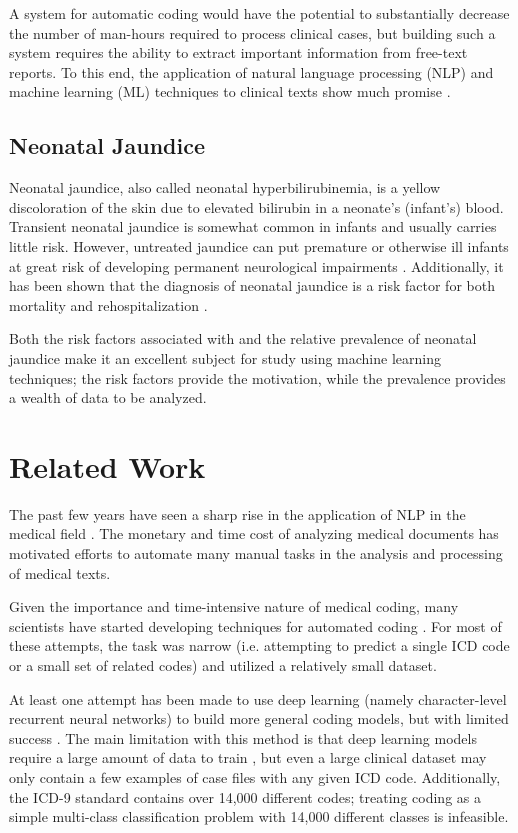 \documentclass[conference]{IEEEtran}
\begin{document}
A system for automatic coding would have the potential to substantially decrease the number of man-hours required to process clinical cases, but building such a system requires the ability to extract important information from free-text reports. To this end, the application of natural language processing (NLP) and machine learning (ML) techniques to clinical texts show much promise \cite{Meystre}.

\subsection{Neonatal Jaundice}\label{AA}
Neonatal jaundice, also called neonatal hyperbilirubinemia, is a yellow discoloration of the skin due to elevated bilirubin in a neonate's (infant's) blood. Transient neonatal jaundice is somewhat common in infants and usually carries little risk. However, untreated jaundice can put premature or otherwise ill infants at great risk of developing permanent neurological impairments \cite{Lantzy}. Additionally, it has been shown that the diagnosis of neonatal jaundice is a risk factor for both mortality and rehospitalization \cite{Escobar}. 

Both the risk factors associated with and the relative prevalence of neonatal jaundice make it an excellent subject for study using machine learning techniques; the risk factors provide the motivation, while the prevalence provides a wealth of data to be analyzed.

\section{Related Work}
The past few years have seen a sharp rise in the application of NLP in the medical field \cite{Wolniewicz}. The monetary and time cost of analyzing medical documents has motivated efforts to automate many manual tasks in the analysis and processing of medical texts.

Given the importance and time-intensive nature of medical coding, many scientists have started developing techniques for automated coding \cite{Meystre}. For most of these attempts, the task was narrow (i.e. attempting to predict a single ICD code or a small set of related codes) and utilized a relatively small dataset. 

At least one attempt has been made to use deep learning (namely character-level recurrent neural networks) to build more general coding models, but with limited success \cite{Shi}. The main limitation with this method is that deep learning models require a large amount of data to train \cite{Chen}, but even a large clinical dataset may only contain a few examples of case files with any given ICD code. Additionally, the ICD-9 standard contains over 14,000 different codes; treating coding as a simple multi-class classification problem with 14,000 different classes is infeasible.
\end{document}
